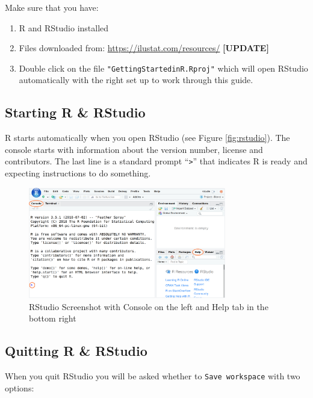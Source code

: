 \documentclass[a4paper,9pt,twocolumn,twoside,printwatermark=false]{pinp}
\providecommand{\tightlist}{%
  \setlength{\itemsep}{0pt}\setlength{\parskip}{0pt}}
\begin{document}
Make sure that you have:

\begin{enumerate}
\def\labelenumi{\arabic{enumi}.}
\tightlist
\item
  R and RStudio installed
\item
  Files downloaded from: \url{https://ilustat.com/resources/}
  \textbf{{[}UPDATE{]}}
\item
  Double click on the file \texttt{"GettingStartedinR.Rproj"} which will
  open RStudio automatically with the right set up to work through this
  guide.
\end{enumerate}

\subsection{Starting R \& RStudio}\label{starting-r-rstudio}

R starts automatically when you open RStudio (see Figure
\ref{fig:rstudio}). The console starts with information about the
version number, license and contributors. The last line is a standard
prompt ``\texttt{\textgreater{}}'' that indicates R is ready and
expecting instructions to do something.

\begin{figure}[H]

{\centering \includegraphics[width=3.4in]{RStudio-Screenshot} 

}

\caption{\label{fig:rstudio}RStudio Screenshot with Console on the left and  Help tab in the bottom right}\label{fig:RStudioScreenshot}
\end{figure}

\subsection{Quitting R \& RStudio}\label{quitting-r-rstudio}

When you quit RStudio you will be asked whether to
\texttt{Save\ workspace} with two options:
\end{document}
